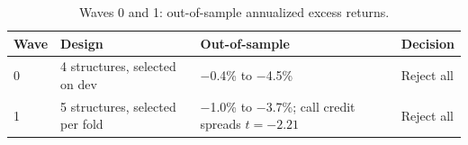 \documentclass[../main.tex]{subfiles}
\begin{document}
\begin{table}[tbp]
\centering\small
\caption{Waves 0 and 1: out-of-sample annualized excess returns.}\label{tab:w01}
\begin{tabular}{@{}llll@{}}
\toprule
Wave & Design & Out-of-sample & Decision \\
\midrule
0 & 4 structures, selected on dev & $-$0.4\% to $-$4.5\% & Reject all \\
1 & 5 structures, selected per fold & $-$1.0\% to $-$3.7\%; call credit spreads $t=-2.21$ & Reject all \\
\bottomrule
\end{tabular}
\end{table}
\end{document}

